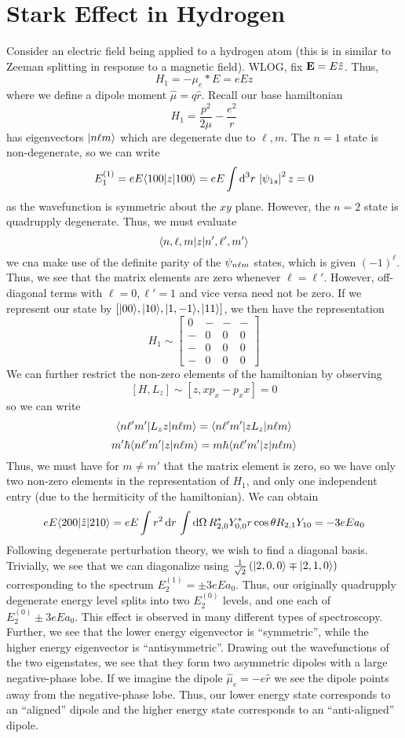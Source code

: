 \section{Stark Effect in Hydrogen}
Consider an electric field being applied to a hydrogen atom (this is in similar to Zeeman splitting in response to a magnetic field). WLOG, fix \(\mathbf{E} = E\hat z\). Thus,
\[H_1 = -\mu_e*E = eE z\]
where we define a dipole moment \(\hat \mu = q\hat r\). Recall our base hamiltonian
\[H_1 = \frac{p^2}{2\mu}-\frac{e^2}{r}\]
has eigenvectors \(\lvert n\ell m\rangle\) which are degenerate due to \(\ell, m\). The \(n=1\) state is non-degenerate, so we can write 
\[E_1^{(1)} = eE\b{100}z\k{100}=eE\int\d[3]{r}\abs{\p_{1s}}^2 z =0\]
as the wavefunction is symmetric about the \(xy\) plane. However, the \(n=2\) state is quadrupply degenerate. Thus, we must evaluate
\[\langle n,\ell, m\rvert z\lvert n',\ell',m'\rangle\]
we cna make use of the definite parity of the \(\psi_{n\ell m}\) states, which is given \((-1)^\ell\). Thus, we see that the matrix elements are zero whenever \(\ell=\ell'\). However, off-diagonal terms with \(\ell=0,\ell'=1\) and vice versa need not be zero. If we represent our state by \([\lvert00\rangle, \lvert10\rangle,\lvert1,-1\rangle,\lvert11\rangle]\), we then have the representation
\[H_1\sim \begin{bmatrix}
	0 & - & - & - \\
	- & 0 & 0 & 0 \\
	- & 0 & 0 & 0 \\
	- & 0 & 0 & 0 
\end{bmatrix}\]
We can further restrict the non-zero elements of the hamiltonian by observing
\[[H,L_z]\sim[z, xp_x-p_xx]=0\]
so we can write
\[\langle n\ell' m'\rvert L_zz\lvert n\ell m\rangle = \langle n\ell'm'\rvert zL_z\lvert n\ell m\rangle\]
\[m'\hbar\langle n\ell' m'\rvert z\lvert n\ell m\rangle = m\hbar\langle n\ell'm'\rvert z\lvert n\ell m\rangle\]
Thus, we must have for \(m\neq m'\) that the matrix element is zero, so we have only two non-zero elements in the representation of \(H_1\), and only one independent entry (due to the hermiticity of the hamiltonian). We can obtain 
\[eE\b{200}\hat z\k{210} = eE\int r^2\d{r}\int\d\Omega R_{2,0}\ast Y_{0,0}\ast r\cos\theta R_{2,1}Y_{10} = -3eEa_0\]
Following degenerate perturbation theory, we wish to find a diagonal basis. Trivially, we see that we can diagonalize using \(\frac{1}{\sqrt{2}}\left(\lvert2,0,0\rangle\mp\lvert2,1,0\rangle\right)\) corresponding to the spectrum \(E_2^{(1)} = \pm 3eEa_0\). Thus, our originally quadrupply degenerate energy level splits into two \(E_2^{(0)}\) levels, and one each of \(E_2^{(0)}\pm 3eEa_0\). This effect is observed in many different types of spectroscopy. Further, we see that the lower energy eigenvector is ``symmetric'', while the higher energy eigenvector is ``antisymmetric''. Drawing out the wavefunctions of the two eigenstates, we see that they form two asymmetric dipoles with a large negative-phase lobe. If we imagine the dipole \(\hat\mu_e = -e\hat r\) we see the dipole points away from the negative-phase lobe. Thus, our lower energy state corresponds to an ``aligned'' dipole and the higher energy state corresponds to an ``anti-aligned'' dipole.

